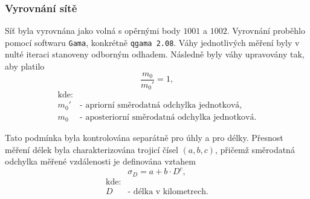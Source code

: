 \subsubsection{Vyrovnání sítě}

Síť byla vyrovnána jako volná s opěrnými body $1001$ a $1002$. 
Vyrovnání proběhlo pomocí softwaru \texttt{Gama}, konkrétně \texttt{qgama 2.08}. 
Váhy jednotlivých měření byly v nulté iteraci stanoveny odborným odhadem. 
Následně byly váhy upravovány tak, aby platilo
\[
\frac{m_0}{m_0'} = 1 ,
\]
\[
\begin{array}{ll}
\text{kde:}& \\
m_0' & \text{- apriorní směrodatná odchylka jednotková}, \\[6pt]
m_0  & \text{- aposteriorní směrodatná odchylka jednotková}.
\end{array}
\]

Tato podmínka byla kontrolována separátně pro úhly a pro délky. 
Přesnost měření délek byla charakterizována trojicí čísel $(a,b,c)$, 
přičemž směrodatná odchylka měřené vzdálenosti je definována vztahem
\[
\sigma_D = a + b \cdot D^c ,
\]
\[
\begin{array}{ll}
\text{kde:}& \\
D & \text{- délka v kilometrech}.
\end{array}
\]
